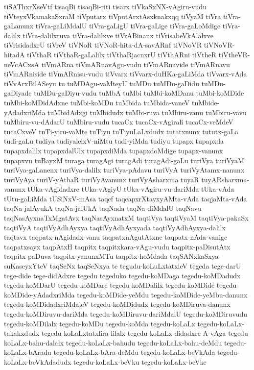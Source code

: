 {tiSAThxrXseVtf
tisaqBi
tisaqBi-riti
tisarx
tiVkaSxNX-vAgiru-vudu
tiVteyxVkamakaSxraM
tiVputarx
tiVputArxtAsxknakxqq
tiVyaM
tiVra
tiVra-gaLanunx
tiVra-gaLiMdalU
tiVra-gaLigU
tiVra-gaLige
tiVra-gaLoMdige
tiVra-dalilx
tiVra-dalilxruva
tiVra-dalilxve
tiVrABinanx
tiVrisabeVkAlalxve
tiVrisidadxrU
tiVreV
tiVNoR
tiVNoR-hita-dA-savARnf
tiVNoVR
tiVNoVR-hitadA
tiVthaR
tiVthaR-gaLalilx
tiVthaRjacnxrU
tiVthARni
tiVtheR
tiVtheVR-neVcACxsA
tiVmARna
tiVmARnavAgu-vudu
tiVmARnavide
tiVmARnavu
tiVmARniside
tiVmARnisu-vudu
tiVvarx
tiVvarx-duHKa-gaLiMda
tiVvarx-vAda
tiVvArxBilASeyu
tu
tuMDAgu-vaMteyU
tuMDu
tuMDu-gaDidu
tuMDu-gaDiyade
tuMDu-gaDiyu-vudu
tuMbA
tuMbi
tuMbi-koMDanu
tuMbi-koMDide
tuMbi-koMDidAdxne
tuMbi-koMDu
tuMbida
tuMbida-vaneV
tuMbide-yAdadxriMda
tuMbidAdxgi
tuMbidudx
tuMbi-ruva
tuMbiru-vanu
tuMbiru-vavu
tuMbiru-vu-dAdarU
tuMbiru-vudu
tucaCx
tucaCx-vAgirali
tucaCx-veMdeV
tucaCxveV
tuTi-yiru-vaMte
tuTiyu
tuTiyuLaLxdudx
tutatxnunx
tututx-gaLa
tudi-gaLu
tudiya
tudiyalelxV-niMtu
tudi-yiMda
tudiyu
tupapx
tupapxda
tupapxdalilx
tupapxdalUlx
tupapxdiMda
tupapxdoMdige
tupapx-vanunx
tupapxvu
tuBayxM
turaga
turagAgi
turagAdi
turagAdi-gaLu
turiVya
turiVyaM
turiVya-gaLanenx
turiVya-dalilx
turiVya-pAdavu
turiVyA
turiVyAtamx-nanunx
turiVyAya
turiV-yAthaR
turiVyAvanunx
turiVyAsharxma
tuyaR
tuyARsharxma-vanunx
tUka-vAgidadxre
tUka-vAgiyU
tUka-vAgiru-vu-dariMda
tUka-vAda
tUtu-gaLiMda
tUSiNxV-mAsa
taqcf
taqcapxrXtayxyAMta-vAda
taqjaMta-vAda
taqNa-jalAyukA
taqNa-jalUkA
taqNada
taqNa-diMdalU
taqNavu
taqNasAyxnaTxMgatAvx
taqNasAyxnatxM
taqtiVya
taqtiVyaM
taqtiVya-pakaSx
taqtiVyA
taqtiVyAdhAyxya
taqtiVyAdhAyxyada
taqtiVyAdhAyxya-dalilx
taqtavx
taqpatx-nAgidadx-vanu
taqpatxnAgutAtxne
taqpatx-nAda-vanige
taqpatxsayx
taqpAtxH
taqpitx
taqpitxkara-vAgu-vudu
taqpitx-paDisutAtx
taqpitx-paDuva
taqpitx-yanunxMTu
taqpitx-hoMdada
taqSANxkaSxya-suKaseyxYteV
taqSeNx
taqSeNxya
te
tegudu-koLuLxtatxleV
tegeda
tege-darU
tege-dide
tege-didAdxre
tegedu
tegeduko
tegedu-koMDaga
tegedu-koMDadudx
tegedu-koMDarU
tegedu-koMDare
tegedu-koMDalilx
tegedu-koMDide
tegedu-koMDide-yAdadxriMda
tegedu-koMDide-yeMdu
tegedu-koMDide-yeMbu-danunx
tegedu-koMDidadxriMdaleV
tegedu-koMDidudx
tegedu-koMDiruva-danunx
tegedu-koMDiruvu-dariMda
tegedu-koMDiruvu-dariMdalU
tegedu-koMDiruvudu
tegedu-koMDilalx
tegedu-koMDu
tegedu-koMda
tegedu-koLaLx
tegedu-koLaLx-takakxdudx
tegedu-koLaLxtatxlira-lilalx
tegedu-koLaLx-didadxre-A-vAga
tegedu-koLaLx-bahu-dalalx
tegedu-koLaLx-bahudu
tegedu-koLaLx-bahu-deMdu
tegedu-koLaLx-bAradu
tegedu-koLaLx-bAra-deMdu
tegedu-koLaLx-beVkAda
tegedu-koLaLx-beVkAdadudx
tegedu-koLaLx-beVku
tegedu-koLaLx-beVke
}
